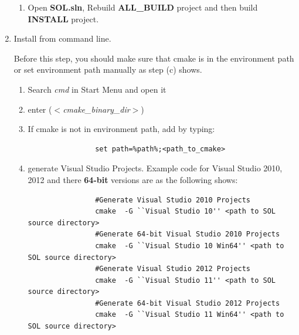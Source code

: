 \documentclass[11pt,a4paper]{article}
\newlength{\wideitemsep}
\let\olditem\item
\renewcommand{\item}{\setlength{\itemsep}{\wideitemsep}\olditem}
\begin{document}
\begin{enumerate}
\begin{enumerate}
            \item Open \textbf{SOL.sln}, Rebuild \textbf{ALL\_BUILD} project and
                then build \textbf{INSTALL} project.
                \begin{figure}[!h]
                    \centering
                    \label{fig:build}
                \end{figure}

        \end{enumerate}

    \item Install from command line. 
        
        Before this step, you should make sure that cmake is in the environment path or set environment path manually
        as step (c) shows.
        \begin{enumerate}
            \item Search \emph{cmd} in {Start Menu} and open it
            \item enter ($<$\emph{cmake\_binary\_dir}$>$)
            \item If cmake is not in environment path, add by typing:
                \lstset{language=bash,
                    framexleftmargin=-3cm,
                    xleftmargin=-3cm,
                }
                \begin{lstlisting}
                set path=%path%;<path_to_cmake>
                \end{lstlisting}
            \item generate Visual Studio Projects. Example code for Visual Studio
                2010, 2012 and there \textbf{64-bit} versions are as the following shows:
                \lstset{language=bash,
                }
                \begin{lstlisting}
                #Generate Visual Studio 2010 Projects
                cmake  -G ``Visual Studio 10'' <path to SOL source directory>
                #Generate 64-bit Visual Studio 2010 Projects
                cmake  -G ``Visual Studio 10 Win64'' <path to SOL source directory>
                #Generate Visual Studio 2012 Projects
                cmake  -G ``Visual Studio 11'' <path to SOL source directory>
                #Generate 64-bit Visual Studio 2012 Projects
                cmake  -G ``Visual Studio 11 Win64'' <path to SOL source directory>
                \end{lstlisting}


\end{enumerate}
\end{enumerate}
\end{document}
